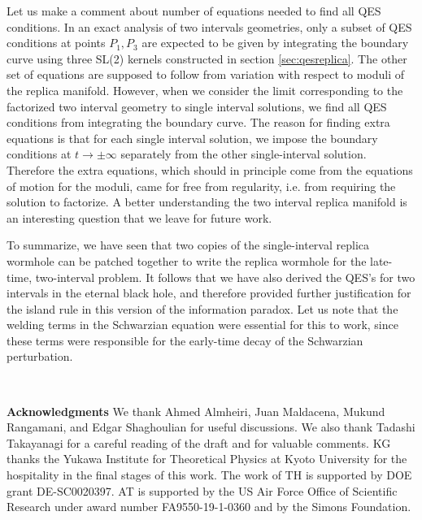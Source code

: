 \documentclass[11pt,oneside,letterpaper]{article}
\numberwithin{equation}{section}
\begin{document}
\begin{spacing}{1.1}
Let us make a comment about  number of equations needed to find all QES conditions. In an exact analysis of two intervals geometries, only a subset of QES conditions at points $P_1, P_3$ are expected to be given by integrating the boundary curve using three SL(2) kernels constructed in section \ref{sec:qesreplica}. The other set of equations are supposed to follow from variation with respect to moduli of the replica manifold. However, when we consider the limit corresponding to the factorized two interval geometry to single interval solutions, we find all QES conditions from integrating the boundary curve. The reason for finding extra equations is that for each single interval solution, we impose the boundary conditions at $t \to \pm \infty$ separately from the other single-interval solution. Therefore the extra equations, which should in principle come from the equations of motion for the moduli, came for free from regularity, i.e. from requiring the solution to factorize. 
 A better understanding the two interval replica manifold is an interesting question that we leave for future work.

To summarize, we have seen that two copies of the single-interval replica wormhole can be patched together to write the replica wormhole for the late-time, two-interval problem. It follows that we have also derived the QES's for two intervals in the eternal black hole, and therefore provided further justification for the island rule in this version of the information paradox. Let us note that the welding terms in the Schwarzian equation were essential for this to work, since these terms were responsible for the early-time decay of the Schwarzian perturbation.


\ \\

\bigskip

\textbf{Acknowledgments}
We thank Ahmed Almheiri, Juan Maldacena, Mukund Rangamani, and Edgar Shaghoulian for useful discussions. We also thank Tadashi Takayanagi for a careful reading of the draft and for valuable comments. KG thanks the Yukawa Institute for Theoretical Physics at Kyoto University for the hospitality in the final stages of this work. The work of TH is supported by  DOE grant DE-SC0020397. AT is supported by the US Air Force Office of Scientific Research under award number FA9550-19-1-0360 and by the Simons Foundation. 
 
 \ \\
 \bigskip
 


\end{spacing}
\end{document}
